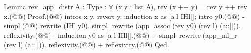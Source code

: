 Lemma rev_app_distr {A : Type} : $\forall$ (x y : list A), rev (x ++ y) = rev y ++ rev x.(@\vspace{-0.04cm}@)
Proof.(@\vspace{-0.04cm}@)
  intros x y. revert y. induction x as [a l IHl|]; intro y0.(@\vspace{-0.04cm}@)
  - simpl.(@\vspace{-0.04cm}@)
    rewrite (IHl y0). simpl. rewrite (app_assoc (rev y0) (rev l) (a::[])). reflexivity.(@\vspace{-0.04cm}@)
  - induction y0 as [a l IHl|].(@\vspace{-0.04cm}@)
    + simpl. rewrite (app_nil_r (rev l) (a::[])). reflexivity.(@\vspace{-0.04cm}@)
    + reflexivity.(@\vspace{-0.04cm}@)
Qed.
